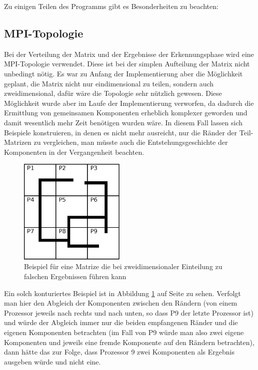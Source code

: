 Zu einigen Teilen des Programms gibt es Besonderheiten zu beachten:

\subsection{MPI-Topologie}

Bei der Verteilung der Matrix und der Ergebnisse der Erkennungsphase wird eine MPI-Topologie verwendet. Diese ist bei der simplen Aufteilung der Matrix nicht unbedingt nötig. Es war zu Anfang der Implementierung aber die Möglichkeit geplant, die Matrix nicht nur eindimensional zu teilen, sondern auch zweidimensional, dafür wäre die Topologie sehr nützlich gewesen. Diese Möglichkeit wurde aber im Laufe der Implementierung verworfen, da dadurch die Ermittlung von gemeinsamen Komponenten erheblich komplexer geworden und damit wesentlich mehr Zeit benötigen wurden wäre. In diesem Fall lassen sich Beispiele konstruieren, in denen es nicht mehr ausreicht, nur die Ränder der Teil-Matrizen zu vergleichen, man müsste auch die Entstehungsgeschichte der Komponenten in der Vergangenheit beachten.

\begin{figure}[tbhp]
	\centering
	\includegraphics[width=0.45\textwidth]{images/bordercompare_illegal}
	\caption{Beispiel für eine Matrize die bei zweidimensionaler Einteilung zu falschen Ergebnissen führen kann}
	\label{fig:bcomp_illegal}
\end{figure}

Ein solch konturiertes Beispiel ist in Abbildung \ref{fig:bcomp_illegal} auf Seite \pageref{fig:bcomp_illegal} zu sehen. Verfolgt man hier den Abgleich der Komponenten zwischen den Rändern (von einem Prozessor jeweils nach rechts und nach unten, so dass P9 der letzte Prozessor ist) und würde der Abgleich immer nur die beiden empfangenen Ränder und die eigenen Komponenten betrachten (im Fall von P9 würde man also zwei eigene Komponenten und jeweils eine fremde Komponente auf den Rändern betrachten), dann hätte das zur Folge, dass Prozessor 9 zwei Komponenten als Ergebnis ausgeben würde und nicht eine.

